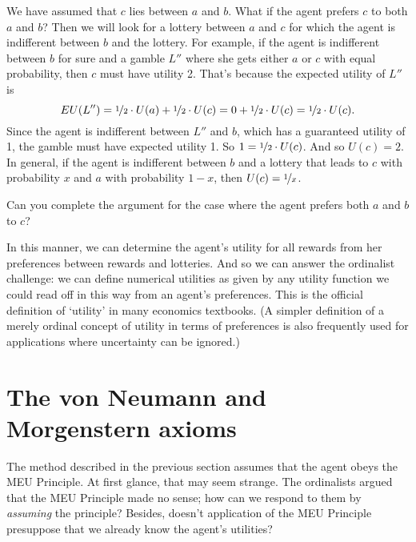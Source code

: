 We have assumed that $c$ lies between $a$ and $b$. What if the agent
prefers $c$ to both $a$ and $b$? Then we will look for a lottery between
$a$ and $c$ for which the agent is indifferent between $b$ and the
lottery. For example, if the agent is indifferent between $b$ for sure
and a gamble $L''$ where she gets either $a$ or $c$ with equal
probability, then $c$ must have utility 2. That's because the expected
utility of $L''$ is
\[
  EU(L'') = \nicefrac{1}{2} \cdot U(a) + \nicefrac{1}{2} \cdot U(c) =  
  0 + \nicefrac{1}{2} \cdot U(c) = \nicefrac{1}{2} \cdot U(c). 
\]
Since the agent is indifferent between $L''$ and $b$, which has a
guaranteed utility of 1, the gamble must have expected utility 1. So
$1 = \nicefrac{1}{2} \cdot U(c)$. And so $U(c) = 2$. In general, if
the agent is indifferent between $b$ and a lottery that leads to $c$
with probability $x$ and $a$ with probability $1-x$, then
$U(c) = \nicefrac{1}{x}$.


\begin{exercise}{2}
  Can you complete the argument for the case where the agent prefers
  both $a$ and $b$ to $c$?
\end{exercise}

In this manner, we can determine the agent's utility for all rewards from her
preferences between rewards and lotteries. And so we can answer the ordinalist
challenge: we can define numerical utilities as given by any utility function we
could read off in this way from an agent's preferences. This is the official
definition of `utility' in many economics textbooks. (A simpler definition of a
merely ordinal concept of utility in terms of preferences is also frequently
used for applications where uncertainty can be ignored.)

\section{The von Neumann and Morgenstern axioms}\label{sec:vnm}

The method described in the previous section assumes that the agent
obeys the MEU Principle. At first glance, that may seem strange. The
ordinalists argued that the MEU Principle made no sense; how can we
respond to them by \emph{assuming} the principle? Besides, doesn't
application of the MEU Principle presuppose that we already know the
agent's utilities?

